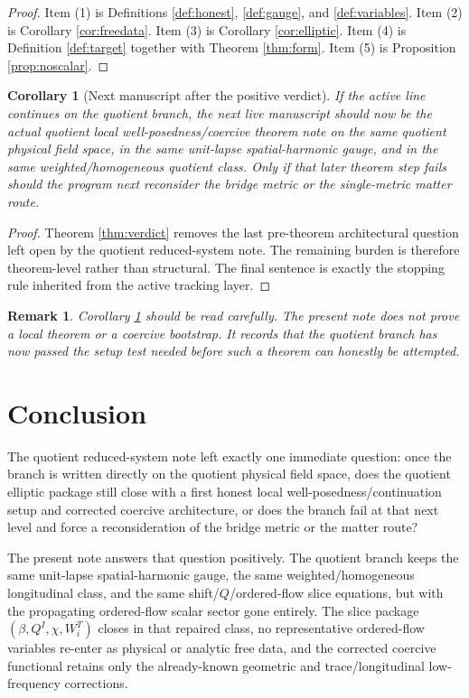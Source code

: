 \documentclass[11pt]{article}
\newtheorem{remark}{Remark}
\newtheorem{corollary}{Corollary}
\begin{document}
\begin{proof}
Item (1) is Definitions \ref{def:honest}, \ref{def:gauge}, and \ref{def:variables}. Item (2) is Corollary \ref{cor:freedata}. Item (3) is Corollary \ref{cor:elliptic}. Item (4) is Definition \ref{def:target} together with Theorem \ref{thm:form}. Item (5) is Proposition \ref{prop:noscalar}.
\end{proof}

\begin{corollary}[Next manuscript after the positive verdict]
\label{cor:next}
If the active line continues on the quotient branch, the next live manuscript should now be the actual quotient local well-posedness/coercive theorem note on the same quotient physical field space, in the same unit-lapse spatial-harmonic gauge, and in the same weighted/homogeneous quotient class. Only if that later theorem step fails should the program next reconsider the bridge metric or the single-metric matter route.
\end{corollary}

\begin{proof}
Theorem \ref{thm:verdict} removes the last pre-theorem architectural question left open by the quotient reduced-system note. The remaining burden is therefore theorem-level rather than structural. The final sentence is exactly the stopping rule inherited from the active tracking layer.
\end{proof}

\begin{remark}
Corollary \ref{cor:next} should be read carefully. The present note does \emph{not} prove a local theorem or a coercive bootstrap. It records that the quotient branch has now passed the setup test needed before such a theorem can honestly be attempted.
\end{remark}

\section{Conclusion}

The quotient reduced-system note left exactly one immediate question: once the branch is written directly on the quotient physical field space, does the quotient elliptic package still close with a first honest local well-posedness/continuation setup and corrected coercive architecture, or does the branch fail at that next level and force a reconsideration of the bridge metric or the matter route?

The present note answers that question positively. The quotient branch keeps the same unit-lapse spatial-harmonic gauge, the same weighted/homogeneous longitudinal class, and the same shift/\(Q\)/ordered-flow slice equations, but with the propagating ordered-flow scalar sector gone entirely. The slice package \((\beta,Q^I,\chi,W_i^T)\) closes in that repaired class, no representative ordered-flow variables re-enter as physical or analytic free data, and the corrected coercive functional retains only the already-known geometric and trace/longitudinal low-frequency corrections.
\end{document}
